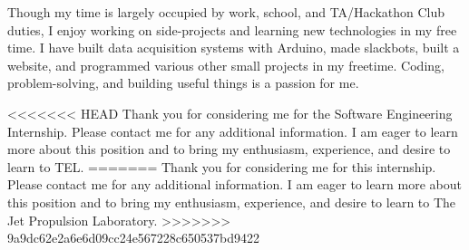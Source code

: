 \documentclass[11pt,a4paper,roman]{moderncv}        %
\begin{document}
Though my time is largely occupied by work, school, and TA/Hackathon Club duties, I enjoy working on side-projects and learning new technologies in my free time. I have built data acquisition systems with Arduino, made slackbots, built a website, and programmed various other small projects in my freetime. Coding, problem-solving, and building useful things is a passion for me.

<<<<<<< HEAD
Thank you for considering me for the Software Engineering Internship. Please contact me for any additional information. I am eager to learn more about this position and to bring my enthusiasm, experience, and desire to learn to TEL. 
=======
Thank you for considering me for this internship. Please contact me for any additional information. I am eager to learn more about this position and to bring my enthusiasm, experience, and desire to learn to The Jet Propulsion Laboratory. 
>>>>>>> 9a9dc62e2a6e6d09cc24e567228c650537bd9422



\makeletterclosing
\end{document}
